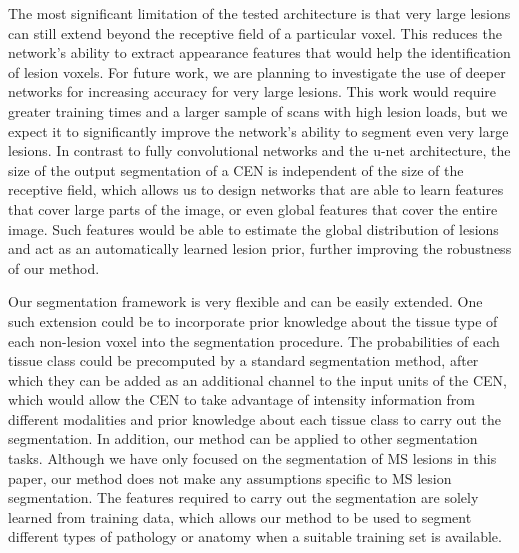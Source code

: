 The most significant limitation of the tested architecture is that very large
lesions can still extend beyond the receptive field of a particular voxel. This
reduces the network's ability to extract appearance features that would help the
identification of lesion voxels. For future work, we are planning to investigate
the use of deeper networks for increasing accuracy for very large lesions.
%
This work would require greater training times and a larger sample of scans with
high lesion loads, but we expect it to significantly improve the network's
ability to segment even very large lesions. In contrast to fully convolutional
networks and the u-net architecture, the size of the output segmentation of a
CEN is independent of the size of the receptive field, which allows us to design
networks that are able to learn features that cover large parts of the image, or
even global features that cover the entire image. Such features would be able to
estimate the global distribution of lesions and act as an automatically learned
lesion prior, further improving the robustness of our method.



Our segmentation framework is very flexible and can be easily extended. One such
extension could be to incorporate prior knowledge about the tissue type of each
non-lesion voxel into the segmentation procedure.
%
%
The probabilities of each tissue class could be precomputed by a standard
segmentation method, after which they can be added as an additional channel to
the input units of the CEN, which would allow the CEN to take advantage of
intensity information from different modalities and prior knowledge about each
tissue class to carry out the segmentation.
%
%
In addition, our method can be applied to other segmentation tasks. Although we
have only focused on the segmentation of MS lesions in this paper, our method
does not make any assumptions specific to MS lesion segmentation. The features
required to carry out the segmentation are solely learned from training data,
which allows our method to be used to segment different types of pathology or
anatomy when a suitable training set is available.
